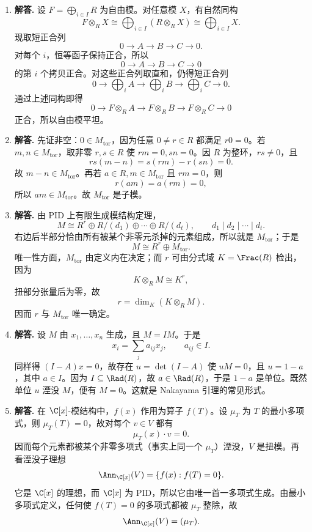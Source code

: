 \begin{enumerate}[label=\textbf{\arabic*.}, leftmargin=*, itemsep=1em]
  \item \textbf{解答.} 设 $F=\bigoplus_{i\in I}R$ 为自由模。对任意模 $X$，有自然同构
  \[
  F\otimes_R X\cong \bigoplus_{i\in I}(R\otimes_R X)\cong \bigoplus_{i\in I}X.
  \]
  现取短正合列
  \[
  0\to A\to B\to C\to 0.
  \]
  对每个 $i$，恒等函子保持正合，所以
  \[
  0\to A\to B\to C\to 0
  \]
  的第 $i$ 个拷贝正合。对这些正合列取直和，仍得短正合列
  \[
  0\to \bigoplus_iA\to \bigoplus_iB\to \bigoplus_iC\to 0.
  \]
  通过上述同构即得
  \[
  0\to F\otimes_R A\to F\otimes_R B\to F\otimes_R C\to 0
  \]
  正合，所以自由模平坦。

  \item \textbf{解答.} 先证非空：$0\in M_{\mathrm{tor}}$，因为任意 $0\ne r\in R$ 都满足 $r0=0$。若 $m,n\in M_{\mathrm{tor}}$，取非零 $r,s\in R$ 使 $rm=0,sn=0$。因 $R$ 为整环，$rs\ne 0$，且
  \[
  rs(m-n)=s(rm)-r(sn)=0.
  \]
  故 $m-n\in M_{\mathrm{tor}}$。再若 $a\in R,m\in M_{\mathrm{tor}}$ 且 $rm=0$，则
  \[
  r(am)=a(rm)=0,
  \]
  所以 $am\in M_{\mathrm{tor}}$。故 $M_{\mathrm{tor}}$ 是子模。

  \item \textbf{解答.} 由 PID 上有限生成模结构定理，
  \[
  M\cong R^r\oplus R/(d_1)\oplus\cdots\oplus R/(d_t),\qquad d_1\mid d_2\mid\cdots\mid d_t.
  \]
  右边后半部分恰由所有被某个非零元杀掉的元素组成，所以就是 $M_{\mathrm{tor}}$；于是
  \[
  M\cong R^r\oplus M_{\mathrm{tor}}.
  \]
  唯一性方面，$M_{\mathrm{tor}}$ 由定义内在决定；而 $r$ 可由分式域 $K=\Frac(R)$ 检出，因为
  \[
  K\otimes_R M\cong K^r,
  \]
  扭部分张量后为零，故
  \[
  r=\dim_K(K\otimes_R M).
  \]
  因而 $r$ 与 $M_{\mathrm{tor}}$ 唯一确定。

  \item \textbf{解答.} 设 $M$ 由 $x_1,\dots,x_n$ 生成，且 $M=IM$。于是
  \[
  x_i=\sum_j a_{ij}x_j,\qquad a_{ij}\in I.
  \]
  同样得 $(I-A)x=0$，故存在 $u=\det(I-A)$ 使 $uM=0$，且 $u=1-a$，其中 $a\in I$。因为 $I\subseteq \Rad(R)$，故 $a\in \Rad(R)$，于是 $1-a$ 是单位。既然单位 $u$ 湮没 $M$，便有 $M=0$。这就是 Nakayama 引理的常见形式。

  \item \textbf{解答.} 在 $\C[x]$-模结构中，$f(x)$ 作用为算子 $f(T)$。设 $\mu_T$ 为 $T$ 的最小多项式，则 $\mu_T(T)=0$，故对每个 $v\in V$ 都有
  \[
  \mu_T(x)\cdot v=0.
  \]
  因而每个元素都被某个非零多项式（事实上同一个 $\mu_T$）湮没，$V$ 是扭模。再看湮没子理想
  \[
  \Ann_{\C[x]}(V)=\{f(x):f(T)=0\}.
  \]
  它是 $\C[x]$ 的理想，而 $\C[x]$ 为 PID，所以它由唯一首一多项式生成。由最小多项式定义，任何使 $f(T)=0$ 的多项式都被 $\mu_T$ 整除，故
  \[
  \Ann_{\C[x]}(V)=(\mu_T).
  \]


\end{enumerate}
